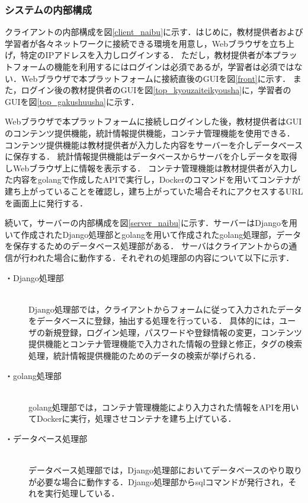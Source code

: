 \subsubsection{システムの内部構成}
クライアントの内部構成を図\ref{client_naibu}に示す．はじめに，教材提供者および学習者が各々ネットワークに接続できる環境を用意し，Webブラウザを立ち上げ，特定のIPアドレスを入力しログインする．
ただし，教材提供者が本プラットフォームの機能を利用するにはログインは必須であるが，学習者は必須ではない．Webブラウザで本プラットフォームに接続直後のGUIを図\ref{front}に示す．
また，ログイン後の教材提供者のGUIを図\ref{top_kyouzaiteikyousha}に，学習者のGUIを図\ref{top_gakushuusha}に示す．

Webブラウザで本プラットフォームに接続しログインした後，教材提供者はGUIのコンテンツ提供機能，統計情報提供機能，コンテナ管理機能を使用できる．
コンテンツ提供機能は教材提供者が入力した内容をサーバーを介しデータベースに保存する．
統計情報提供機能はデータベースからサーバを介しデータを取得しWebブラウザ上に情報を表示する．
コンテナ管理機能は教材提供者が入力した内容をgolangで作成したAPIで実行し，Dockerのコマンドを用いてコンテナが建ち上がっていることを確認し，建ち上がっていた場合それにアクセスするURLを画面上に発行する．

続いて，サーバーの内部構成を図\ref{server_naibu}に示す．サーバーはDjangoを用いて作成されたDjango処理部とgolangを用いて作成されたgolang処理部，データを保存するためのデータベース処理部がある．
サーバはクライアントからの通信が行われた場合に動作する．それぞれの処理部の内容について以下に示す．

\begin{description}
    \item[・Django処理部]\mbox{}\\
        Django処理部では，クライアントからフォームに従って入力されたデータをデータベースに登録，抽出する処理を行っている．
        具体的には，ユーザの新規登録，ログイン処理，パスワードや登録情報の変更，コンテンツ提供機能とコンテナ管理機能で入力された情報の登録と修正，タグの検索処理，統計情報提供機能のためのデータの検索が挙げられる．
    \item[・golang処理部]\mbox{}\\
        golang処理部では，コンテナ管理機能により入力された情報をAPIを用いてDockerに実行，処理させコンテナを建ち上げている．
    \item[・データベース処理部]\mbox{}\\
        データベース処理部では，Django処理部においてデータベースのやり取りが必要な場合に動作する．Django処理部からsqlコマンドが発行され，それを実行処理している．
\end{description}

